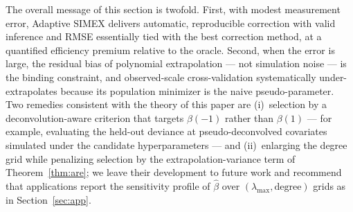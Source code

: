 The overall message of this section is twofold. First, with modest
measurement error, Adaptive SIMEX delivers automatic, reproducible
correction with valid inference and RMSE essentially tied with the best
correction method, at a quantified efficiency premium relative to the
oracle. Second, when the error is large, the residual bias of
polynomial extrapolation --- not simulation noise --- is the binding
constraint, and observed-scale cross-validation systematically
under-extrapolates because its population minimizer is the naive
pseudo-parameter. Two remedies consistent with the theory of this paper
are (i)~selection by a deconvolution-aware criterion that targets
$\beta(-1)$ rather than $\beta(1)$ --- for example, evaluating the
held-out deviance at pseudo-deconvolved covariates simulated under the
candidate hyperparameters --- and (ii)~enlarging the degree grid while
penalizing selection by the extrapolation-variance term of
Theorem~\ref{thm:are}; we leave their development to future work and
recommend that applications report the sensitivity profile of
$\hat\beta$ over $(\lambda_{\max},\text{degree})$ grids as in
Section~\ref{sec:app}.

